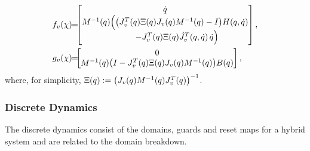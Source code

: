 %
\begin{align}
  f_{v}\arx \!\! &= \!\!\! \left[\!\!\!\begin{array}{c}
    \dq\\
    \M^{-1}\argsq\Big( \big(J_{v}^{T}\argsq \Xi\argsq J_{v}\argsq \M^{-1}\argsq - I \big) \HCor\argsqdq \\
    \hspace{1cm}- J_{v}^{T}\argsq \Xi\argsq {\dot J}_{v}^{T}\argsqdq \, \dq \Big)
    \end{array}\!\!\!\right],\\
  \label{eqn:controlsystem}
  g_{v}\arx \!\! &= \!\!\! \left[\!\!\!\begin{array}{c}
    0\\
    \M^{-1}\argsq \big(I - J_{v}^{T}\argsq \Xi\argsq J_{v}\argsq \M^{-1}\argsq \big) \B\argsq
    \end{array}\!\!\!\right],
\end{align}
%
where, for simplicity, $\Xi(q) := \big( J_{v}(q) M^{-1}(q) J_{v}^{T}(q) \big)^{-1}$.


\subsubsection{Discrete Dynamics}

The discrete dynamics consist of the domains, guards and reset maps for a hybrid system and are related to the domain breakdown.

